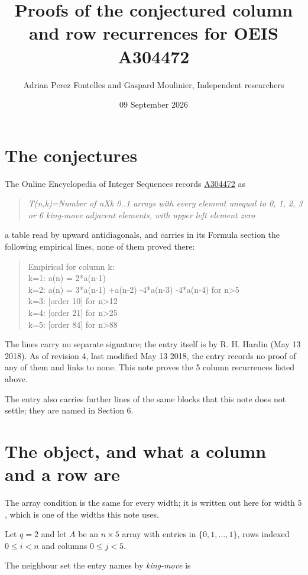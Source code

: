\documentclass[11pt]{article}
\title{Proofs of the conjectured column and row recurrences for OEIS A304472}
\author{Adrian Perez Fontelles and Gaspard Moulinier, Independent researchers}
\date{09 September 2026}
\theoremstyle{definition}
\begin{document}
\maketitle
\section{The conjectures}

The Online Encyclopedia of Integer Sequences records \href{https://oeis.org/A304472}{A304472} as

\begin{quote}\itshape T(n,k)=Number of nXk 0..1 arrays with every element unequal to 0, 1, 2, 3 or 6 king-move adjacent elements, with upper left element zero\end{quote}

a table read by upward antidiagonals, and carries in its Formula section the following empirical lines, none of them proved there:

\begin{quote}\ttfamily Empirical for column k:\\
k=1: a(n) = 2*a(n-1)\\k=2: a(n) = 3*a(n-1) +a(n-2) -4*a(n-3) -4*a(n-4) for n>5\\k=3: [order 10] for n>12\\k=4: [order 21] for n>25\\k=5: [order 84] for n>88\end{quote}

The lines carry no separate signature; the entry itself is by R. H. Hardin (May 13 2018). As of revision 4, last modified May 13 2018, the entry records no proof of any of them and links to none. This note proves the 5 column recurrences listed above.

The entry also carries further lines of the same blocks that this note does not settle; they are named in Section 6.

\section{The object, and what a column and a row are}

The array condition is the same for every width; it is written out here for width $5$, which is one of the widths this note uses.

Let $q = 2$ and let $A$ be an $n \times 5$ array with entries in $\{0,1,\dots,1\}$, rows indexed $0 \le i < n$ and columns $0 \le j < 5$.

The neighbour set the entry names by {\itshape king-move} is
\end{document}
